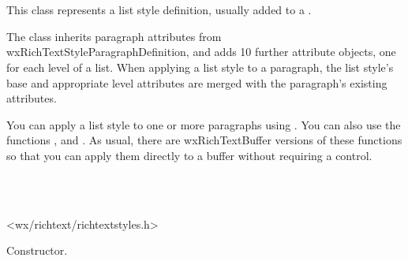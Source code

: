 \section{}\label{wxrichtextliststyledefinition}

This class represents a list style definition, usually added to a .

The class inherits paragraph attributes from wxRichTextStyleParagraphDefinition, and adds 10 further attribute objects, one for each level of a list.
When applying a list style to a paragraph, the list style's base and appropriate level attributes are merged with the
paragraph's existing attributes.

You can apply a list style to one or more paragraphs using . You
can also use the functions ,  and 
. As usual, there are wxRichTextBuffer versions of these functions
so that you can apply them directly to a buffer without requiring a control.


\\
\\


<wx/richtext/richtextstyles.h>





\label{wxrichtextliststyledefinitionwxrichtextliststyledefinition}


Constructor.

\label{wxrichtextliststyledefinitiondtor}

